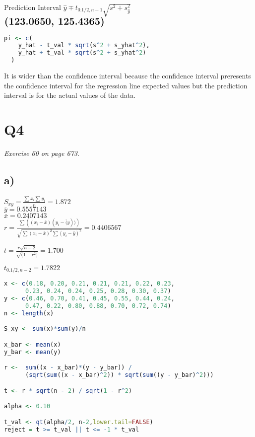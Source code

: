 \documentclass[a4paper,11pt]{article}
\begin{document}
\begin{multicols}{2}
  Prediction Interval
  $\hat{y} \mp t_{0.1/2,n-1}\sqrt{s^2 + s_{\hat{y}}^2}$\\

  $\textbf{\Large{(123.0650, 125.4365)}}$ \\ 

\columnbreak
  \begin{lstlisting}[language=R]
  pi <- c(
    y_hat - t_val * sqrt(s^2 + s_yhat^2),
    y_hat + t_val * sqrt(s^2 + s_yhat^2)
  )
  \end{lstlisting}
\end{multicols}

It is wider than the confidence interval because the confidence interval preresents the confidence interval for
the regression line expected values but  the prediction interval is for the actual values of the data.

\pagebreak


\section*{Q4}
\textit{Exercise 60 on page 673.}

\subsection*{a)}

\begin{multicols}{2}

$S_{xy} = \frac{\sum{x_i}\sum{y_i}}{n} = 1.872$ \\

$ \bar{y} = 0.5557143 $\\

$ \bar{x} = 0.2407143$ \\

$r = \frac{
  \sum{\left((x_i - \bar{x})(y_i - \bar(y))\right)}
  }{
    \sqrt{\sum{(x_i - \bar{x})^2} \sum{(y_i - \bar{y})^2} }
  } = 0.4406567
$

$t = \frac{r\sqrt{n-2}}{\sqrt(1 - r^2)} = 1.700$

$t_{0.1/2, n-2} = 1.7822$

\columnbreak
\begin{lstlisting}[language=R]
x <- c(0.18, 0.20, 0.21, 0.21, 0.21, 0.22, 0.23, 
      0.23, 0.24, 0.24, 0.25, 0.28, 0.30, 0.37)
y <- c(0.46, 0.70, 0.41, 0.45, 0.55, 0.44, 0.24, 
      0.47, 0.22, 0.80, 0.88, 0.70, 0.72, 0.74)
n <- length(x)

S_xy <- sum(x)*sum(y)/n

x_bar <- mean(x)
y_bar <- mean(y)

r <-  sum((x - x_bar)*(y - y_bar)) /
      (sqrt(sum((x - x_bar)^2)) * sqrt(sum((y - y_bar)^2)))

t <- r * sqrt(n - 2) / sqrt(1 - r^2)

alpha <- 0.10

t_val <- qt(alpha/2, n-2,lower.tail=FALSE)
reject = t >= t_val || t <= -1 * t_val

\end{lstlisting}
\end{multicols}
\end{document}
